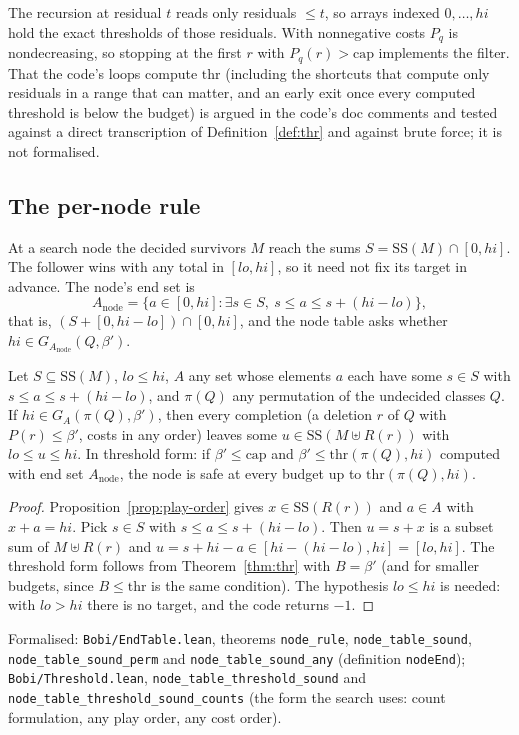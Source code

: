 \begin{remark}
The recursion at residual $t$ reads only residuals $\le t$, so arrays indexed
$0,\dots,hi$ hold the exact thresholds of those residuals. With nonnegative
costs $P_q$ is nondecreasing, so stopping at the first $r$ with
$P_q(r)>\mathrm{cap}$ implements the filter. That the code's loops compute
$\mathrm{thr}$ (including the shortcuts that compute only residuals in a range
that can matter, and an early exit once every computed threshold is below the
budget) is argued in the code's doc comments and tested against a direct
transcription of Definition~\ref{def:thr} and against brute force; it is not
formalised.
\end{remark}

\subsection{The per-node rule}

At a search node the decided survivors $M$ reach the sums $S=\mathrm{SS}(M)\cap[0,hi]$.
The follower wins with any total in $[lo,hi]$, so it need not fix its target
in advance. The node's end set is
\[
  A_{\mathrm{node}}=\{a\in[0,hi] : \exists s\in S,\ s\le a\le s+(hi-lo)\},
\]
that is, $(S+[0,hi-lo])\cap[0,hi]$, and the node table asks whether
$hi\in G_{A_{\mathrm{node}}}(Q,\beta')$.

\begin{theorem}\label{thm:node-rule}
Let $S\subseteq\mathrm{SS}(M)$, $lo\le hi$, $A$ any set whose elements $a$ each have
some $s\in S$ with $s\le a\le s+(hi-lo)$, and $\pi(Q)$ any permutation of the
undecided classes $Q$. If $hi\in G_A(\pi(Q),\beta')$, then every completion
(a deletion $r$ of $Q$ with $P(r)\le\beta'$, costs in any order) leaves some
$u\in\mathrm{SS}(M\uplus R(r))$ with $lo\le u\le hi$. In threshold form: if
$\beta'\le\mathrm{cap}$ and $\beta'\le\mathrm{thr}(\pi(Q),hi)$ computed with end set
$A_{\mathrm{node}}$, the node is safe at every budget up to $\mathrm{thr}(\pi(Q),hi)$.
\end{theorem}
\begin{proof}
Proposition~\ref{prop:play-order} gives $x\in\mathrm{SS}(R(r))$ and $a\in A$ with
$x+a=hi$. Pick $s\in S$ with $s\le a\le s+(hi-lo)$. Then $u=s+x$ is a subset sum
of $M\uplus R(r)$ and $u=s+hi-a\in[hi-(hi-lo),hi]=[lo,hi]$. The threshold form
follows from Theorem~\ref{thm:thr} with $B=\beta'$ (and for smaller budgets,
since $B\le\mathrm{thr}$ is the same condition). The hypothesis $lo\le hi$ is
needed: with $lo>hi$ there is no target, and the code returns $-1$.
\end{proof}
{\raggedright\noindent Formalised: \texttt{Bobi/EndTable.lean}, theorems
\texttt{node\_rule}, \texttt{node\_table\_sound}, \texttt{node\_table\_sound\_perm}
and \texttt{node\_table\_sound\_any} (definition \texttt{nodeEnd});
\texttt{Bobi/Threshold.lean}, \texttt{node\_table\_threshold\_sound} and
\texttt{node\_table\_threshold\_sound\_counts} (the form the search uses:
count formulation, any play order, any cost order).\par}

